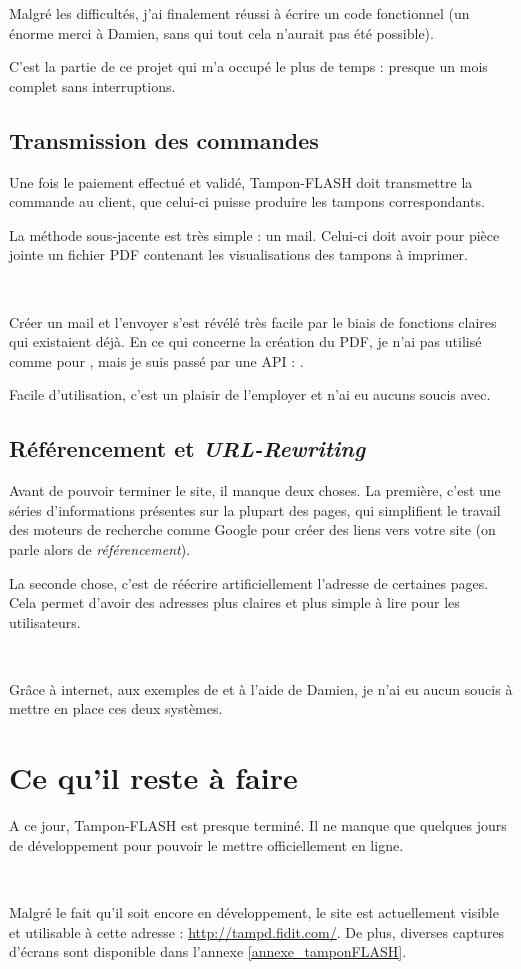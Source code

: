 Malgré les difficultés, j'ai finalement réussi à écrire un code fonctionnel (un énorme merci à Damien, sans qui tout cela n'aurait pas été possible).

C'est la partie de ce projet qui m'a occupé le plus de temps : presque un mois complet sans interruptions.

\subsection{Transmission des commandes}
Une fois le paiement effectué et validé, Tampon-FLASH doit transmettre la commande au client, que celui-ci puisse produire les tampons correspondants.

La méthode sous-jacente est très simple : un mail. Celui-ci doit avoir pour pièce jointe un fichier PDF contenant les visualisations des tampons à imprimer.

~

Créer un mail et l'envoyer s'est révélé très facile par le biais de fonctions claires qui existaient déjà. En ce qui concerne la création du PDF, je n'ai pas utilisé \pdfcreator{} comme pour \solulog, mais je suis passé par une API : .

Facile d'utilisation, c'est un plaisir de l'employer et n'ai eu aucuns soucis avec.

\subsection{Référencement et \emph{URL-Rewriting}}
Avant de pouvoir terminer le site, il manque deux choses. La première, c'est une séries d'informations présentes sur la plupart des pages, qui simplifient le travail des moteurs de recherche comme Google pour créer des liens vers votre site (on parle alors de \emph{référencement}).

La seconde chose, c'est de réécrire artificiellement l'adresse de certaines pages. Cela permet d'avoir des adresses plus claires et plus simple à lire pour les utilisateurs.

~

Grâce à internet, aux exemples de \fidit{} et à l'aide de Damien, je n'ai eu aucun soucis à mettre en place ces deux systèmes.

\section{Ce qu'il reste à faire}
A ce jour, Tampon-FLASH est presque terminé. Il ne manque que quelques jours de développement pour pouvoir le mettre officiellement en ligne.

~

Malgré le fait qu'il soit encore en développement, le site est actuellement visible et utilisable à cette adresse : \url{http://tampd.fidit.com/}. De plus, diverses captures d'écrans sont disponible dans l'annexe \ref{annexe_tamponFLASH}.
